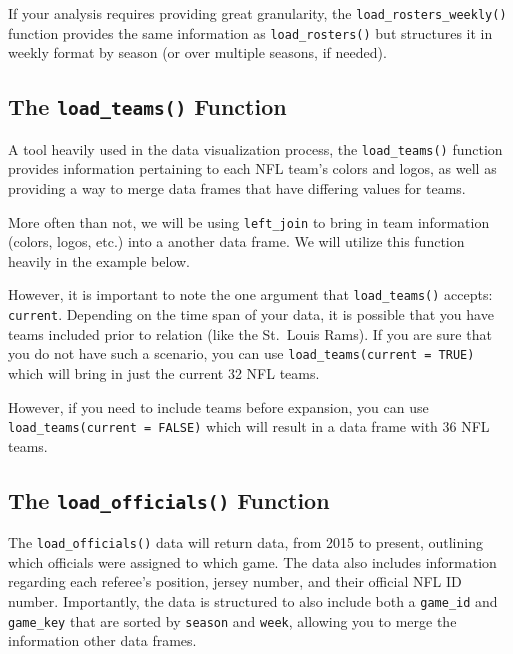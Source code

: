 \documentclass[
  letterpaper,
]{krantz}
\begin{document}
If your analysis requires providing great granularity, the
\texttt{load\_rosters\_weekly()} function provides the same information
as \texttt{load\_rosters()} but structures it in weekly format by season
(or over multiple seasons, if needed).

\hypertarget{the-load_teams-function}{%
\subsection{\texorpdfstring{The \texttt{load\_teams()}
Function}{The load\_teams() Function}}\label{the-load_teams-function}}

A tool heavily used in the data visualization process, the
\texttt{load\_teams()} function provides information pertaining to each
NFL team's colors and logos, as well as providing a way to merge data
frames that have differing values for teams.

More often than not, we will be using \texttt{left\_join} to bring in
team information (colors, logos, etc.) into a another data frame. We
will utilize this function heavily in the example below.

However, it is important to note the one argument that
\texttt{load\_teams()} accepts: \texttt{current}. Depending on the time
span of your data, it is possible that you have teams included prior to
relation (like the St.~Louis Rams). If you are sure that you do not have
such a scenario, you can use \texttt{load\_teams(current\ =\ TRUE)}
which will bring in just the current 32 NFL teams.

However, if you need to include teams before expansion, you can use
\texttt{load\_teams(current\ =\ FALSE)} which will result in a data
frame with 36 NFL teams.

\hypertarget{the-load_officials-function}{%
\subsection{\texorpdfstring{The \texttt{load\_officials()}
Function}{The load\_officials() Function}}\label{the-load_officials-function}}

The \texttt{load\_officials()} data will return data, from 2015 to
present, outlining which officials were assigned to which game. The data
also includes information regarding each referee's position, jersey
number, and their official NFL ID number. Importantly, the data is
structured to also include both a \texttt{game\_id} and
\texttt{game\_key} that are sorted by \texttt{season} and \texttt{week},
allowing you to merge the information other data frames.
\end{document}
